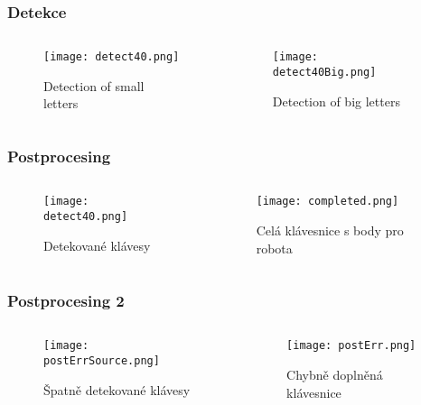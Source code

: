 \begin{frame}
   \frametitle{Detekce}
   \begin{columns}[t, onlytextwidth]
      \begin{column}[T]{0.5\textwidth}
         \begin{figure}[h]
         		\centering
         		\texttt{[image: detect40.png]}
			\caption{Detection of small letters}
		\end{figure}
      \end{column}
      \begin{column}[T]{0.50\textwidth}
		\begin{figure}[h]
         		\centering
         		\texttt{[image: detect40Big.png]}
			\caption{Detection of big letters}
		\end{figure}
      \end{column}
   \end{columns}
\end{frame}

\begin{frame}
   \frametitle{Postprocesing}
   \begin{columns}[t, onlytextwidth]
      \begin{column}[T]{0.5\textwidth}
         \begin{figure}[h]
         		\centering
         		\texttt{[image: detect40.png]}
			\caption{Detekované klávesy}
		\end{figure}
      \end{column}
      \begin{column}[T]{0.50\textwidth}
		\begin{figure}[h]
         		\centering
         		\texttt{[image: completed.png]}
			\caption{Celá klávesnice s body pro robota}
		\end{figure}
      \end{column}
   \end{columns}
\end{frame}

\begin{frame}
   \frametitle{Postprocesing 2}
   \begin{columns}[t, onlytextwidth]
      \begin{column}[T]{0.5\textwidth}
         \begin{figure}[h]
         		\centering
         		\texttt{[image: postErrSource.png]}
			\caption{Špatně detekované klávesy}
		\end{figure}
      \end{column}
      \begin{column}[T]{0.50\textwidth}
		\begin{figure}[h]
         		\centering
         		\texttt{[image: postErr.png]}
			\caption{Chybně doplněná klávesnice}
		\end{figure}
      \end{column}
   \end{columns}
\end{frame}

